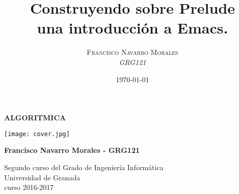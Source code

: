 \documentclass[a4paper, 11pt]{article}
\title{\textbf{Construyendo sobre Prelude}\\ %
					una introducción a Emacs.} %
\author{\textsc{Francisco Navarro Morales} %
\\{\textit{GRG121}}} %
\date{\today} %
\makeatletter
\renewcommand{\maketitle}{
  \begin{flushright} %
  
  {\LARGE\@title} %
  
  \vspace{50pt} %
  
  {\large\@author} %
  \\\@date %
  \vspace{40pt} %
  \end{flushright}
}
\makeatother
\begin{document}
	
	
	\begin{titlepage}
		\begin{center}
			\vspace*{2cm}
			
			{\Large \textbf{ALGORITMICA}}
			
			
			\vspace{2cm}
			
			
		    \texttt{[image: cover.jpg]}
			
			\vspace{2cm}
			
			\textbf{Francisco Navarro Morales - GRG121 }
			
			\vfill
			
			Segundo curso del Grado de Ingeniería Informática\\
			Universidad de Granada\\
			curso 2016-2017\\
			
		\end{center}
	\end{titlepage}



\renewcommand{\abstractname}{Resumen} %



{\parskip=2pt
  \tableofcontents
}


\pagebreak
\end{document}

